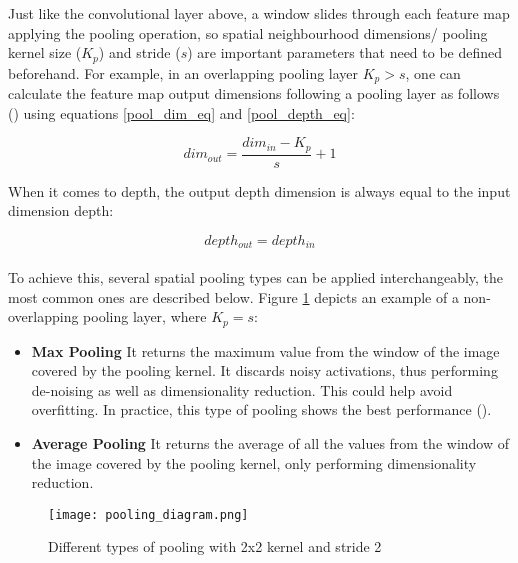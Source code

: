 Just like the convolutional layer above, a window slides through each feature map applying the pooling operation, so spatial neighbourhood dimensions/ pooling kernel size ($K_p$) and stride ($s$) are important parameters that need to be defined beforehand. For example, in an overlapping pooling layer $K_p > s$, one can calculate the feature map output dimensions following a pooling layer as follows (\cite{dumoulin2018guide}) using equations \ref{pool_dim_eq} and \ref{pool_depth_eq}:

\begin{equation}
    \label{pool_dim_eq}
    dim_{out} = \frac{dim_{in} - K_p}{s} + 1
\end{equation}

When it comes to depth, the output depth dimension is always equal to the input dimension depth:

\begin{equation}
    \label{pool_depth_eq}
    depth_{out} = depth_{in}
\end{equation}

\paragraph{}
To achieve this, several spatial pooling types can be applied interchangeably, the most common ones are described below. Figure \ref{fig_pooling} depicts an example of a non-overlapping pooling layer, where $K_p = s$:

\begin{itemize}
    \item \textbf{Max Pooling} It returns the maximum value from the window of the image covered by the pooling kernel. It discards noisy activations, thus performing de-noising as well as dimensionality reduction. This could help avoid overfitting. In practice, this type of pooling shows the best performance (\cite{GoodBengCour16}).
    \item \textbf{Average Pooling} It returns the average of all the values from the window of the image covered by the pooling kernel, only performing dimensionality reduction.
\end{itemize}

    \begin{figure}[hbt!]
        \centering
        \texttt{[image: pooling\_diagram.png]}
        \caption{Different types of pooling with 2x2 kernel and stride 2}
        \label{fig_pooling}
    \end{figure}
    


